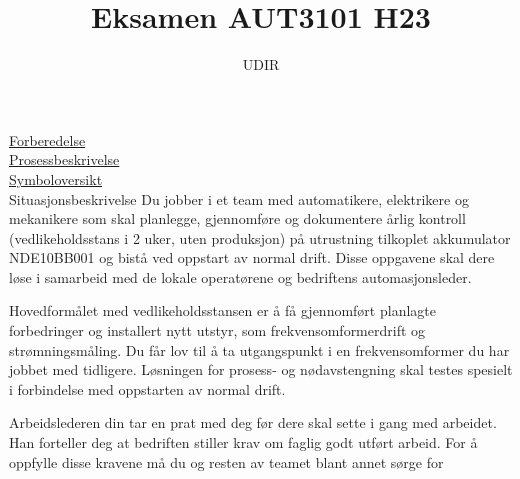 \documentclass[12pt,a4paper]{article}
\begin{document}
\title{Eksamen AUT3101 H23}
\author{UDIR}
\maketitle
\href{https://rfka-my.sharepoint.com/:b:/g/personal/fred-olav_mosdal_skole_rogfk_no/EYahFY-vecBLvHQl1q9yLxMB8lLpnBmBPlguMa5OClkMVw?e=OXyckd}{Forberedelse}\\
\href{https://rfka-my.sharepoint.com/:b:/g/personal/fred-olav_mosdal_skole_rogfk_no/Ef-DBug2ZDZDrA0y3PQ1nHAB6KOZUvYeCZ45gFhwlFw9IA?e=1cSOTM}{Prosessbeskrivelse}\\
\href{https://rfka-my.sharepoint.com/:b:/g/personal/fred-olav_mosdal_skole_rogfk_no/ESrkbpSQtQJJvCxtDD68DP8BnyQyh2LqUFdKkSv97DNSxw?e=dgDBLg}{Symboloversikt}\\
Situasjonsbeskrivelse
\vskip  0.25cm
Du jobber i et team med automatikere, elektrikere og mekanikere som skal planlegge, gjennomføre og dokumentere årlig kontroll (vedlikeholdsstans i 2 uker, uten produksjon) på utrustning tilkoplet akkumulator NDE10BB001 og bistå ved oppstart av normal drift. Disse oppgavene skal dere løse i samarbeid med de lokale operatørene og bedriftens automasjonsleder.  

\vskip 0.25cm
Hovedformålet med vedlikeholdsstansen er å få gjennomført planlagte forbedringer og installert nytt utstyr, som frekvensomformerdrift og strømningsmåling. Du får lov til å ta utgangspunkt i en frekvensomformer du har jobbet med tidligere. Løsningen for prosess- og nødavstengning skal testes spesielt i forbindelse med oppstarten av normal drift.  

\vskip 0.25cm
Arbeidslederen din tar en prat med deg før dere skal sette i gang med arbeidet. Han forteller deg at bedriften stiller krav om faglig godt utført arbeid. For å oppfylle disse kravene må du og resten av teamet blant annet sørge for  
\end{document}
